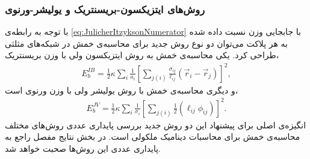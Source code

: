 \subsubsection{
روش‌های ایتزیکسون-بریسنتریک و یولیشر-ورنوی
}
با توجه به رابطه‌ی 
\ref{eq:JulicherItzyksonNumerator}
با جابجایی وزن نسبت داده شده به هر پلاکت می‌توان دو نوع روش جدید برای محاسبه‌ی خمش در شبکه‌های مثلثی طراحی کرد. یکی محاسبه‌ی خمش به روش ایتزیکسون ولی با وزن بریسنتریک،
\begin{eqnarray}
E_{b}^{IB}=\frac{1}{2}\kappa\sum_{i}\frac{1}{a_i}\left[\sum_{j(i)}\frac{\sigma_{ij}}{\ell_{ij}}(\vec r_i-\vec r_j)\right]^2,
\label{eq:ItzyksonBarycentricPotential}
\end{eqnarray}
و دیگری محاسبه‌ی خمش با روش یولیشر ولی با وزن ورنوی است،
\begin{eqnarray}
E_{b}^{JV}=\frac{1}{2}\kappa\sum_{i}\frac{1}{\sigma_i}\left[\sum_{j(i)}\frac{1}{2}(\ell_{ij}\phi_{ij})\right]^2.
\label{eq:JulicherVoronoiPotential}
\end{eqnarray}
انگیزه‌ی اصلی برای پیشنهاد این دو روش جدید بررسی پایداری عددی روش‌های مختلف محاسبه‌ی خمش برای محاسبات دینامیک ملکولی است.  در بخش نتایج مفصل راجع به پایداری عددی این روش‌ها صحبت خواهد شد.








 
